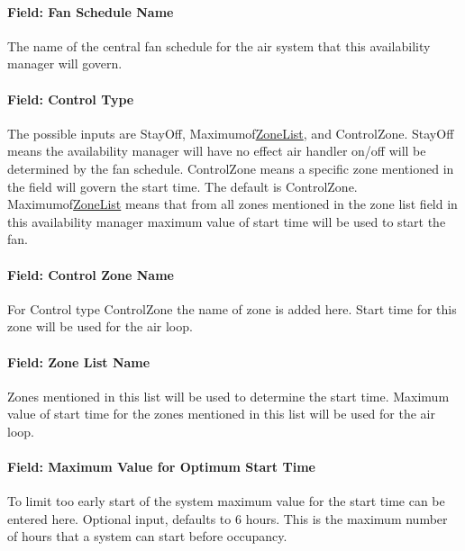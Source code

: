 \paragraph{Field: Fan Schedule Name}\label{field-fan-schedule-name-1}

The name of the central fan schedule for the air system that this availability manager will govern.

\paragraph{Field: Control Type}\label{field-control-type-003}

The possible inputs are StayOff, Maximumof\hyperref[zonelist]{ZoneList}, and ControlZone. StayOff means the availability manager will have no effect air handler on/off will be determined by the fan schedule. ControlZone means a specific zone mentioned in the field will govern the start time. The default is ControlZone. Maximumof\hyperref[zonelist]{ZoneList} means that from all zones mentioned in the zone list field in this availability manager maximum value of start time will be used to start the fan.

\paragraph{Field: Control Zone Name}\label{field-control-zone-name-1-000}

For Control type ControlZone the name of zone is added here. Start time for this zone will be used for the air loop.

\paragraph{Field: Zone List Name}\label{field-zone-list-name}

Zones mentioned in this list will be used to determine the start time. Maximum value of start time for the zones mentioned in this list will be used for the air loop.

\paragraph{Field: Maximum Value for Optimum Start Time}\label{field-maximum-value-for-optimum-start-time}

To limit too early start of the system maximum value for the start time can be entered here. Optional input, defaults to 6 hours. This is the maximum number of hours that a system can start before occupancy.

